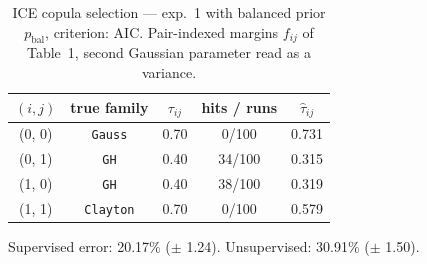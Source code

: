 \begin{table}[htbp]
  \centering
  \caption{ICE copula selection — exp.\ 1 with balanced prior $p_{\text{bal}}$, criterion: AIC. Pair-indexed margins $f_{ij}$ of Table~1, second Gaussian parameter read as a variance.}
  \label{tab:exp3-exp1_bal_p__aic}
  \begin{tabular}{ccccc}
    \toprule
    $(i, j)$ & true family & $\tau_{ij}$ & hits / runs & $\hat\tau_{ij}$ \\
    \midrule
    (0, 0) & \texttt{Gauss} & 0.70 & 0/100 & 0.731 \\
    (0, 1) & \texttt{GH} & 0.40 & 34/100 & 0.315 \\
    (1, 0) & \texttt{GH} & 0.40 & 38/100 & 0.319 \\
    (1, 1) & \texttt{Clayton} & 0.70 & 0/100 & 0.579 \\
    \bottomrule
  \end{tabular}
  \par\smallskip Supervised error: 20.17\% ($\pm$ 1.24). Unsupervised: 30.91\% ($\pm$ 1.50).
\end{table}
